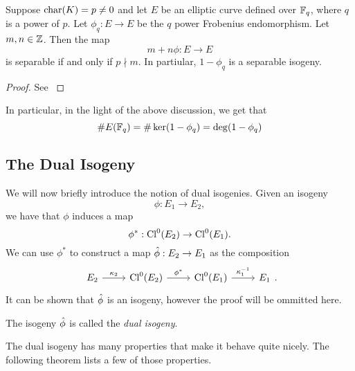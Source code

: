 \begin{proposition}
	\label{prop:frobenius-separable}
	Suppose $\operatorname{char}(K) = p \neq 0$ and
	let $E$ be an elliptic curve defined over
	$\mathbb{F}_q$, where $q$ is a power of $p$. 
	Let $\phi_q: E \to E$ be the
	$q$ power Frobenius endomorphism.
	Let $m, n \in \mathbb{Z}$.
	Then the map
	\begin{equation*}
		m + n\phi: E\to E
	\end{equation*}
	is separable if and only if $p\nmid m$.
	In partiular, $1 - \phi_q$ is a separable isogeny.
\end{proposition}
\begin{proof}
	See \cite[III.5.5]{silverman}
\end{proof}

In particular, in the light of the above discussion, we get that
\begin{equation*}
	\#E(\mathbb{F}_q) = \#\ker(1 - \phi_q) = \deg(1 - \phi_q)
\end{equation*}

\subsection{The Dual Isogeny}

We will now briefly introduce the notion of dual isogenies. 
Given an isogeny
\begin{equation*}
	\phi: E_1 \to E_2,
\end{equation*}
we have that $\phi$ induces a map
\begin{equation*}
	\phi^*: \operatorname{Cl}^0(E_2) \to \operatorname{Cl}^0(E_1).
\end{equation*}
We can use $\phi^*$ to construct a map $\Hat\phi: E_2 \to E_1$
as the composition
\begin{equation*}
	\begin{tikzcd}
		{E_2} & {\Cl^0(E_2)} & {\Cl^0(E_1)} & {E_1}
		\arrow["{\kappa_2}", from=1-1, to=1-2]
		\arrow["{\phi^*}", from=1-2, to=1-3]
		\arrow["{\kappa_1^{-1}}", from=1-3, to=1-4]
	\end{tikzcd}.
\end{equation*}
It can be shown that $\Hat\phi$ is an isogeny, however the proof will be
ommitted here.

\begin{definition}
	The isogeny $\Hat\phi$ is called the \emph{dual isogeny}.
\end{definition}

The dual isogeny has many properties that make it behave quite nicely.
The following theorem lists a few of those properties.


